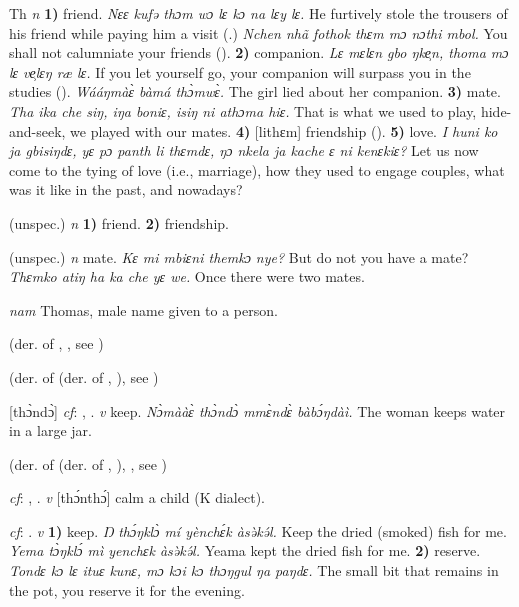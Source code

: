 \begin{letter}{Th}
 \textit{n} \textbf{1)} friend. \textit{Nɛɛ kufə thɔm wɔ lɛ kɔ na lɛy lɛ.} He furtively stole the trousers of his friend while paying him a visit (\citealt{Pichl1967}.) \textit{Nchen nhã fothok thɛm mɔ nɔthi mbol.} You shall not calumniate your friends (\citealt{Pichl1967}). \textbf{2)} companion. \textit{Lɛ mɛlɛn gbo ŋke̹n, thoma mɔ lɛ ve̹lɛŋ ræ lɛ.} If you let yourself go, your companion will surpass you in the studies (\citealt{Pichl1967}). \textit{Wááŋmàɛ̀ bàmá thɔ̀mwɛ̀.} The girl lied about her companion. \textbf{3)} mate. \textit{Tha ika che siŋ, iŋa boniɛ, isiŋ ni athɔma hiɛ.} That is what we used to play, hide-and-seek, we played with our mates. \textbf{4)} [lithɛm] friendship (\citealt{Pichl1967}). \textbf{5)} love. \textit{I huni ko ja gbisiŋdɛ, yɛ pɔ panth li thɛmdɛ, ŋɔ nkela ja kache ɛ ni kenɛkiɛ?} Let us now come to the tying of love (i.e., marriage), how they used to engage couples, what was it like in the past, and nowadays?

 (unspec.) \textit{n} \textbf{1)} friend. \textbf{2)} friendship.

 (unspec.) \textit{n} mate. \textit{Kɛ mi mbiɛni themkɔ nye?} But do not you have a mate? \textit{Thɛmko atiŋ ha ka che yɛ we.} Once there were two mates.

 \textit{nam} Thomas, male name given to a person.

 (der. of , , see ) 

 (der. of  (der. of , ), see )

 [thɔ̀ndɔ̀] \textit{cf}: , . \textit{v} keep. \textit{Nɔ̀mààɛ̀ thɔ̀ndɔ̀ mmɛ̀ndɛ̀ bàbɔ́ŋdàì.} The woman keeps water in a large jar.

 (der. of  (der. of , ), , see )

 \textit{cf}: , . \textit{v} [thɔ́nthɔ́] calm a child (K dialect). 

 \textit{cf}: . \textit{v} \textbf{1)} keep. \textit{Ŋ thɔ́ŋklɔ̀ mí yènchɛ́k àsə̀kə́l.} Keep the dried (smoked) fish for me. \textit{Yema tɔ̀ŋklɔ́ mì yenchɛk àsə̀kə́l.} Yeama kept the dried fish for me. \textbf{2)} reserve. \textit{Tondɛ kɔ lɛ ituɛ kunɛ, mɔ kɔi kɔ thɔŋgul ŋa paŋdɛ.} The small bit that remains in the pot, you reserve it for the evening.


\end{letter}
